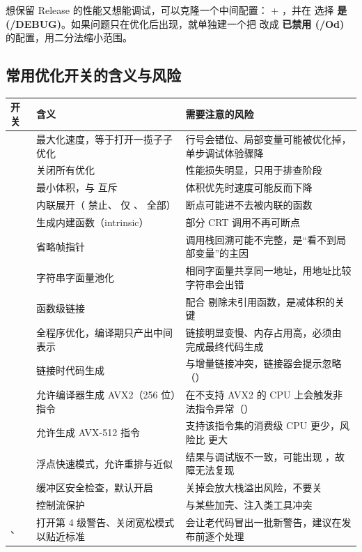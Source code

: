 \begin{tipbox}[提示]
想保留 Release 的性能又想能调试，可以克隆一个中间配置： + ，并在  选择 \textbf{是 (/DEBUG)}。如果问题只在优化后出现，就单独建一个把  改成 \textbf{已禁用 (/Od)} 的配置，用二分法缩小范围。
\end{tipbox}
\subsection{常用优化开关的含义与风险}
\begin{longtable}{L{2.6cm}L{5.4cm}L{6.6cm}}
\toprule
\textbf{开关} & \textbf{含义} & \textbf{需要注意的风险} \\
\midrule
\endhead
\bottomrule
\endlastfoot
{} & 最大化速度，等于打开一揽子子优化 & 行号会错位、局部变量可能被优化掉，单步调试体验骤降 \\
 & 关闭所有优化 & 性能损失明显，只用于排查阶段 \\
 & 最小体积，与  互斥 & 体积优先时速度可能反而下降 \\
 & 内联展开（ 禁止、 仅 、 全部） & 断点可能进不去被内联的函数 \\
 & 生成内建函数（intrinsic） & 部分 CRT 调用不再可断点 \\
 & 省略帧指针 & 调用栈回溯可能不完整，是“看不到局部变量”的主因 \\
 & 字符串字面量池化 & 相同字面量共享同一地址，用地址比较字符串会出错 \\
 & 函数级链接 & 配合  剔除未引用函数，是减体积的关键 \\
 & 全程序优化，编译期只产出中间表示 & 链接明显变慢、内存占用高，必须由  完成最终代码生成 \\
 & 链接时代码生成 & 与增量链接冲突，链接器会提示忽略 （） \\
 & 允许编译器生成 AVX2（256 位）指令 & 在不支持 AVX2 的 CPU 上会触发非法指令异常（） \\
 & 允许生成 AVX-512 指令 & 支持该指令集的消费级 CPU 更少，风险比  更大 \\
 & 浮点快速模式，允许重排与近似 & 结果与调试版不一致，可能出现 ，故障无法复现 \\
 & 缓冲区安全检查，默认开启 & 关掉会放大栈溢出风险，不要关 \\
 & 控制流保护 & 与某些加壳、注入类工具冲突 \\
、 & 打开第 4 级警告、关闭宽松模式以贴近标准 & 会让老代码冒出一批新警告，建议在发布前逐个处理 \\
\end{longtable}

